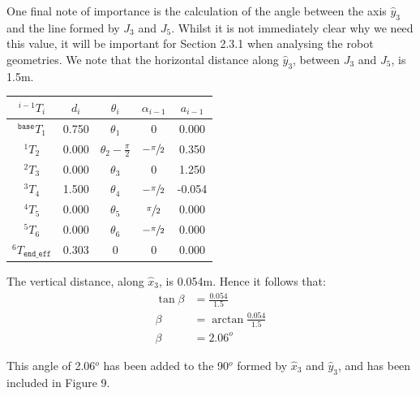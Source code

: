 \documentclass[a4paper]{article}
\begin{document}
\begin{minipage}{0.45\textwidth}
One final note of importance is the calculation of the angle between the axis $\hat{y}_3$ and the line formed by $J_3$ and $J_5$. Whilst it is not immediately clear why we need this value, it will be important for Section 2.3.1 when analysing the robot geometries. We note that the horizontal distance along $\hat{y}_3$, between $J_3$ and $J_5$, is 1.5$\si{\meter}$.
\end{minipage}
\hspace{1cm}
\begin{minipage}{0.45\textwidth}
	\centering
	\begin{tabular}{ccccc}
		\toprule
		$^{i-1} T_i$ 				& $d_i$ 	& $\theta_i$ 					& $\alpha_{i-1}$ 	& $a_{i-1}$\\ 
		\midrule
		$^\texttt{base} T_1$ 		& 0.750 	& $\theta_1$ 					& 0 				& 0.000\\
		$^1 T_2$ 					& 0.000 	& $\theta_2 - \frac{\pi}{2}$ 	& $-\sfrac{\pi}{2}$ & 0.350\\
		$^2 T_3$ 					& 0.000 	& $\theta_3$ 					& 0 				& 1.250\\
		$^3 T_4$ 					& 1.500 	& $\theta_4$ 					& $-\sfrac{\pi}{2}$ & -0.054\\
		$^4 T_5$ 					& 0.000 	& $\theta_5$ 					& $\sfrac{\pi}{2}$ 	& 0.000\\
		$^5 T_6$ 					& 0.000 	& $\theta_6$ 					& $-\sfrac{\pi}{2}$ & 0.000\\
		$^6 T_\texttt{end\_eff}$ 	& 0.303 	& 0 							& 0 				& 0.000\\
		\bottomrule
	\end{tabular}
\end{minipage}

\vspace{0.5cm}

The vertical distance, along $\hat{x}_3$, is 0.054$\si{\meter}$. Hence it follows that:
\begin{align*}
\tan \beta 	&= \frac{0.054}{1.5}\\
\beta 		&= \arctan \frac{0.054}{1.5}\\
\beta		&= 2.06^o
\end{align*}  

This angle of 2.06$^o$ has been added to the 90$^o$ formed by $\hat{x}_3$ and $\hat{y}_3$, and has been included in Figure 9.

\newpage
\end{document}
